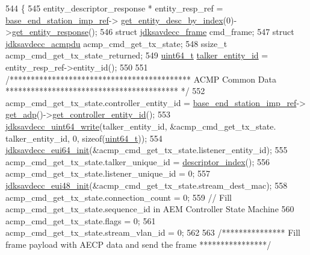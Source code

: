 \begin{DoxyCode}
544 \{
545     entity\_descriptor\_response * entity\_resp\_ref = \hyperlink{classavdecc__lib_1_1descriptor__base__imp_a550c969411f5f3b69f55cc139763d224}{base\_end\_station\_imp\_ref}->
      \hyperlink{classavdecc__lib_1_1end__station__imp_a2039add3a7eb753152149e07a86ad008}{get\_entity\_desc\_by\_index}(0)->\hyperlink{classavdecc__lib_1_1entity__descriptor_ac31dd117f0c931ae93c8ba52df7211bd}{get\_entity\_response}();
546     \textcolor{keyword}{struct }\hyperlink{structjdksavdecc__frame}{jdksavdecc\_frame} cmd\_frame;
547     \textcolor{keyword}{struct }\hyperlink{structjdksavdecc__acmpdu}{jdksavdecc\_acmpdu} acmp\_cmd\_get\_tx\_state;
548     ssize\_t acmp\_cmd\_get\_tx\_state\_returned;
549     \hyperlink{parse_8c_aec6fcb673ff035718c238c8c9d544c47}{uint64\_t} \hyperlink{structjdksavdecc__acmpdu_a5a263561481c86cc310ff078f7313b6d}{talker\_entity\_id} = entity\_resp\_ref->entity\_id();
550 
551     \textcolor{comment}{/******************************************* ACMP Common Data *****************************************
      */}
552     acmp\_cmd\_get\_tx\_state.controller\_entity\_id = \hyperlink{classavdecc__lib_1_1descriptor__base__imp_a550c969411f5f3b69f55cc139763d224}{base\_end\_station\_imp\_ref}->
      \hyperlink{classavdecc__lib_1_1end__station__imp_a471a74540ce6182fad0c17dfd010107e}{get\_adp}()->\hyperlink{classavdecc__lib_1_1adp_a0c0959a46658c0a22e9530334b2912da}{get\_controller\_entity\_id}();
553     \hyperlink{group__endian_gaa294fd85c2d887032dad294c6833c903}{jdksavdecc\_uint64\_write}(talker\_entity\_id, &acmp\_cmd\_get\_tx\_state.
      talker\_entity\_id, 0, \textcolor{keyword}{sizeof}(\hyperlink{parse_8c_aec6fcb673ff035718c238c8c9d544c47}{uint64\_t}));
554     \hyperlink{group__eui64_ga6eda4ed21b6f0d526b180ac633eeba69}{jdksavdecc\_eui64\_init}(&acmp\_cmd\_get\_tx\_state.listener\_entity\_id);
555     acmp\_cmd\_get\_tx\_state.talker\_unique\_id = \hyperlink{classavdecc__lib_1_1descriptor__base__imp_ac23c0a35276c07cfce8c8660700c2135}{descriptor\_index}();
556     acmp\_cmd\_get\_tx\_state.listener\_unique\_id = 0;
557     \hyperlink{group__eui48_gae0bd9d7b819e8314b425d7c8bbae2333}{jdksavdecc\_eui48\_init}(&acmp\_cmd\_get\_tx\_state.stream\_dest\_mac);
558     acmp\_cmd\_get\_tx\_state.connection\_count = 0;
559     \textcolor{comment}{// Fill acmp\_cmd\_get\_tx\_state.sequence\_id in AEM Controller State Machine}
560     acmp\_cmd\_get\_tx\_state.flags = 0;
561     acmp\_cmd\_get\_tx\_state.stream\_vlan\_id = 0;
562 
563     \textcolor{comment}{/*************** Fill frame payload with AECP data and send the frame ****************/}

\end{DoxyCode}
